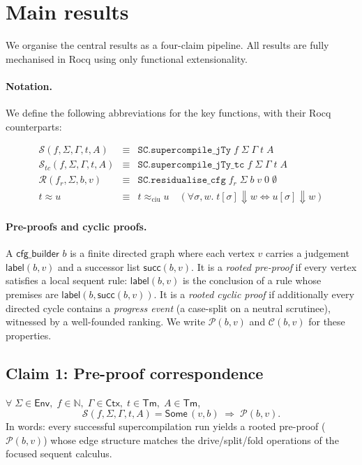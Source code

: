 \section{Main results}
\label{sec:equiv}

We organise the central results as a four-claim pipeline. All results are fully mechanised in Rocq using only functional extensionality.

\paragraph{Notation.}
We define the following abbreviations for the key functions, with their Rocq counterparts:

\[
\begin{array}{lll}
\mathcal{S}(f,\Sigma,\Gamma,t,A) & \equiv & \texttt{SC.supercompile\_jTy}\;f\;\Sigma\;\Gamma\;t\;A \\
\mathcal{S}_{\!\mathit{tc}}(f,\Sigma,\Gamma,t,A) & \equiv & \texttt{SC.supercompile\_jTy\_tc}\;f\;\Sigma\;\Gamma\;t\;A \\
\mathcal{R}(f_r,\Sigma,\mathit{b},v) & \equiv & \texttt{SC.residualise\_cfg}\;f_r\;\Sigma\;\mathit{b}\;v\;0\;\emptyset \\
t \approx u & \equiv & t \approx_{\mathrm{ciu}} u \quad (\forall\sigma,w.\; t[\sigma] \Downarrow w \iff u[\sigma] \Downarrow w)
\end{array}
\]

\paragraph{Pre-proofs and cyclic proofs.}
A $\mathsf{cfg\_builder}$ $b$ is a finite directed graph where each vertex $v$ carries a judgement $\mathsf{label}(b,v)$ and a successor list $\mathsf{succ}(b,v)$. It is a \emph{rooted pre-proof} if every vertex satisfies a local sequent rule: $\mathsf{label}(b,v)$ is the conclusion of a rule whose premises are $\mathsf{label}(b,\mathsf{succ}(b,v))$. It is a \emph{rooted cyclic proof} if additionally every directed cycle contains a \emph{progress event} (a case-split on a neutral scrutinee), witnessed by a well-founded ranking. We write $\mathcal{P}(b,v)$ and $\mathcal{C}(b,v)$ for these properties.

\subsection{Claim 1: Pre-proof correspondence}

\begin{theorem}
\label{thm:pre-proof}
\noindent
$\forall\;\Sigma\in\mathsf{Env},\;f\in\mathbb{N},\;\Gamma\in\mathsf{Ctx},\;t\in\mathsf{Tm},\;A\in\mathsf{Tm}$,
\[
  \mathcal{S}(f,\Sigma,\Gamma,t,A) = \mathsf{Some}\,(v,\mathit{b})
  \;\Longrightarrow\;
  \mathcal{P}(\mathit{b},v).
\]
In words: every successful supercompilation run yields a rooted pre-proof ($\mathcal{P}(\mathit{b},v)$) whose edge structure matches the drive/split/fold operations of the focused sequent calculus.
\end{theorem}

